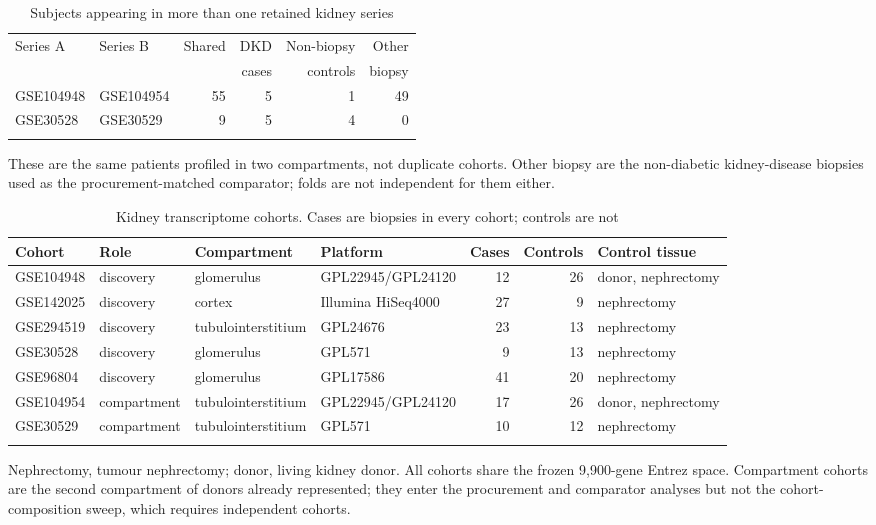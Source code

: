 \documentclass[unnumsec,webpdf,contemporary,large,numbered]{oup-authoring-template}
\begin{document}
\begin{table}[!t]
\caption{Subjects appearing in more than one retained kidney series}\label{tab:overlap}
\tabcolsep=3pt
\begin{tabular*}{\columnwidth}{@{\extracolsep\fill}llrrrr@{\extracolsep\fill}}
\toprule
Series A & Series B & Shared & DKD & Non-biopsy & Other \\
         &          &        & cases & controls & biopsy \\
\midrule
GSE104948 & GSE104954 & 55 & 5 & 1 & 49 \\
GSE30528 & GSE30529 & 9 & 5 & 4 & 0 \\
\botrule
\end{tabular*}
\begin{tablenotes}%
\item These are the same patients profiled in two compartments, not duplicate cohorts. Other biopsy are the non-diabetic kidney-disease biopsies used as the procurement-matched comparator; folds are not independent for them either.
\end{tablenotes}
\end{table}

\begin{table}[!t]
\caption{Kidney transcriptome cohorts. Cases are biopsies in every cohort; controls are not}\label{tab:cohorts}
\tabcolsep=0pt
\begin{tabular*}{\textwidth}{@{\extracolsep\fill}llllrrl@{\extracolsep\fill}}
\toprule
Cohort & Role & Compartment & Platform & Cases & Controls & Control tissue \\
\midrule
GSE104948 & discovery & glomerulus & GPL22945/GPL24120 & 12 & 26 & donor, nephrectomy \\
GSE142025 & discovery & cortex & Illumina HiSeq4000 & 27 & 9 & nephrectomy \\
GSE294519 & discovery & tubulointerstitium & GPL24676 & 23 & 13 & nephrectomy \\
GSE30528 & discovery & glomerulus & GPL571 & 9 & 13 & nephrectomy \\
GSE96804 & discovery & glomerulus & GPL17586 & 41 & 20 & nephrectomy \\
GSE104954 & compartment & tubulointerstitium & GPL22945/GPL24120 & 17 & 26 & donor, nephrectomy \\
GSE30529 & compartment & tubulointerstitium & GPL571 & 10 & 12 & nephrectomy \\
\botrule
\end{tabular*}
\begin{tablenotes}%
\item Nephrectomy, tumour nephrectomy; donor, living kidney donor. All cohorts share the frozen 9,900-gene Entrez space. Compartment cohorts are the second compartment of donors already represented; they enter the procurement and comparator analyses but not the cohort-composition sweep, which requires independent cohorts.
\end{tablenotes}
\end{table}
\end{document}
